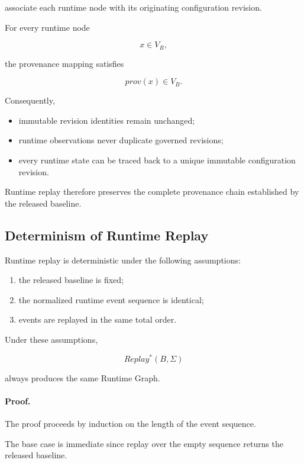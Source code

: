 \documentclass[10pt]{article}
\begin{document}
associate each runtime node with its originating configuration revision.

For every runtime node

\[
x\in V_R,
\]

the provenance mapping satisfies

\begin{equation}
prov(x)
\in
V_B.
\end{equation}

Consequently,

\begin{itemize}
	\item immutable revision identities remain unchanged;
	\item runtime observations never duplicate governed revisions;
	\item every runtime state can be traced back to a unique immutable
	configuration revision.
\end{itemize}

Runtime replay therefore preserves the complete provenance chain established by
the released baseline.

\subsection{Determinism of Runtime Replay}
\label{appendix:runtime_determinism}

Runtime replay is deterministic under the following assumptions:

\begin{enumerate}
	\item the released baseline is fixed;
	\item the normalized runtime event sequence is identical;
	\item events are replayed in the same total order.
\end{enumerate}

Under these assumptions,

\[
Replay^*(B,\Sigma)
\]

always produces the same Runtime Graph.

\paragraph*{Proof.}

The proof proceeds by induction on the length of the event sequence.

The base case is immediate since replay over the empty sequence returns the
released baseline.
\end{document}
